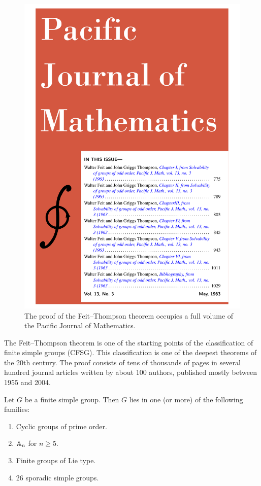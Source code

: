 \begin{figure}[h]
    \includegraphics[scale=0.2]{FeitThompson.pdf}
    \caption{The proof of the Feit--Thompson theorem occupies a full volume of 
the Pacific Journal of Mathematics.}
    \label{fig:FeitThompson}
\end{figure}

The Feit--Thompson theorem is one of the starting points
of the classification of finite simple groups (CFSG). 
This classification is one
of the deepest theorems 
of the 20th century. The proof consists of tens of thousands 
of pages in several hundred journal articles written 
by about 100 authors, published mostly between 1955 and 2004.

\begin{theorem}[CFSG]
\label{thm:CFSG}
Let $G$ be a finite simple group. Then $G$ lies in one (or more) 
of the following families:
\begin{enumerate}
    \item Cyclic groups of prime order.
    \item $\mathbb{A}_n$ for $n\geq5$.
    \item Finite groups of Lie type.
    \item 26 sporadic simple groups.
\end{enumerate}
\end{theorem}

